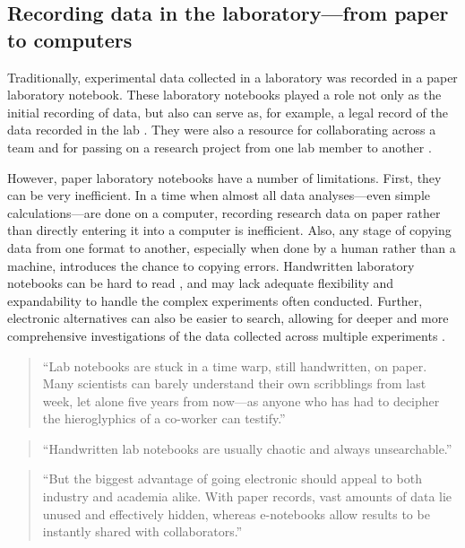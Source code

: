 \documentclass[]{tufte-book}
\begin{document}
\hypertarget{recording-data-in-the-laboratoryfrom-paper-to-computers}{%
\subsection{Recording data in the laboratory---from paper to computers}\label{recording-data-in-the-laboratoryfrom-paper-to-computers}}

Traditionally, experimental data collected in a laboratory was recorded in a
paper laboratory notebook. These laboratory notebooks played a role not only as
the initial recording of data, but also can serve as, for example, a legal
record of the data recorded in the lab \citep{mascarelli2014research}. They were also
a resource for collaborating across a team and for passing on a research project
from one lab member to another \citep{butler2005electronic}.

However, paper laboratory notebooks have a number of limitations. First, they
can be very inefficient. In a time when almost all data analyses---even simple
calculations---are done on a computer, recording research data on paper rather
than directly entering it into a computer is inefficient. Also, any stage of
copying data from one format to another, especially when done by a human rather
than a machine, introduces the chance to copying errors. Handwritten laboratory
notebooks can be hard to read \citep{butler2005electronic, perkel2011coding}, and
may lack adequate flexibility and expandability to handle the complex
experiments often conducted. Further, electronic alternatives can also be easier
to search, allowing for deeper and more comprehensive investigations of the data
collected across multiple experiments \citep{giles2012digital, butler2005electronic, perkel2011coding}.

\begin{quote}
``Lab notebooks are stuck in a time warp, still handwritten, on paper. Many
scientists can barely understand their own scribblings from last week, let alone
five years from now---as anyone who has had to decipher the hieroglyphics of a
co-worker can testify.'' \citep{butler2005electronic}
\end{quote}

\begin{quote}
``Handwritten lab notebooks are usually chaotic and always unsearchable.''
\citep{perkel2011coding}
\end{quote}

\begin{quote}
``But the biggest advantage of going electronic should appeal to both industry and
academia alike. With paper records, vast amounts of data lie unused and
effectively hidden, whereas e-notebooks allow results to be instantly shared with
collaborators.'' \citep{butler2005electronic}
\end{quote}
\end{document}
